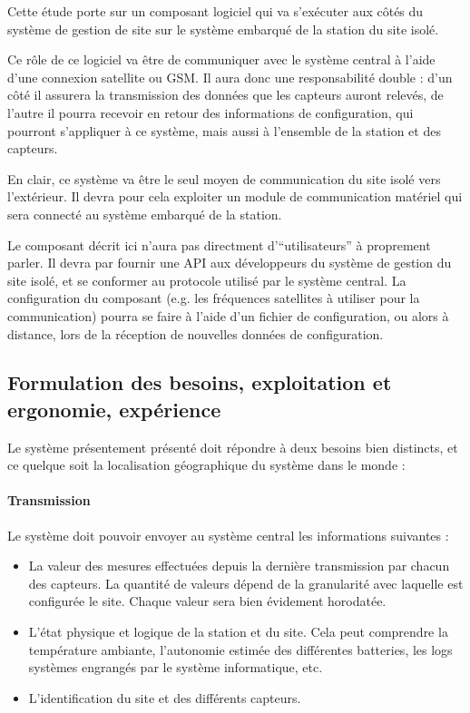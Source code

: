 Cette étude porte sur un composant logiciel qui va s'exécuter aux côtés du système de gestion de site sur le système embarqué de la station du site isolé.

Ce rôle de ce logiciel va être de communiquer avec le système central à l'aide d'une connexion satellite ou GSM. Il aura donc une responsabilité double : d'un côté il assurera la transmission des données que les capteurs auront relevés, de l'autre il pourra recevoir en retour des informations de configuration, qui pourront s'appliquer à ce système, mais aussi à l'ensemble de la station et des capteurs.

En clair, ce système va être le seul moyen de communication du site isolé vers l'extérieur. Il devra pour cela exploiter un module de communication matériel qui sera connecté au système embarqué de la station.

Le composant décrit ici n'aura pas directment d'``utilisateurs'' à proprement parler. Il devra par fournir une API aux développeurs du système de gestion du site isolé, et se conformer au protocole utilisé par le système central. La configuration du composant (e.g. les fréquences satellites à utiliser pour la communication) pourra se faire à l'aide d'un fichier de configuration, ou alors à distance, lors de la réception de nouvelles données de configuration.

\subsection{Formulation des besoins, exploitation et ergonomie, expérience}

Le système présentement présenté doit répondre à deux besoins bien distincts, et ce quelque soit la localisation géographique du système dans le monde :

\paragraph{Transmission} Le système doit pouvoir envoyer au système central les informations suivantes :

\begin{itemize}
\item La valeur des mesures effectuées depuis la dernière transmission par chacun des capteurs. La quantité de valeurs dépend de la granularité avec laquelle est configurée le site. Chaque valeur sera bien évidement horodatée.
\item L'état physique et logique de la station et du site. Cela peut comprendre la température ambiante, l'autonomie estimée des différentes batteries, les logs systèmes engrangés par le système informatique, etc.
\item L'identification du site et des différents capteurs. %
\end{itemize}

